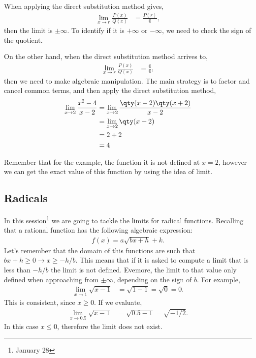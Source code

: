 \documentclass[../main-notes.tex]{subfile}
\begin{document}
When applying the direct substitution method gives,
\begin{align*}
    \lim_{x\to r}\frac{P(x)}{Q(x)} &= \frac{P(r)}{0},
\end{align*}
then the limit is \(\pm\infty\).
To identify if it is $+\infty$ or $-\infty$, we need to check the sign of the quotient.

On the other hand, when the direct substitution method arrives to,
\begin{align*}
    \lim_{x\to r}\frac{P(x)}{Q(x)} &= \frac{0}{0},
\end{align*}
then we need to make algebraic manipulation.
The main strategy is to factor and cancel common terms, and then apply the direct substitution method,
\begin{align*}
\lim_{x\to2}\frac{x^2-4}{x-2} &= \lim_{x\to2}\frac{\qty(x-2)\qty(x+2)}{x-2} \\
                              &= \lim_{x\to2}\qty(x+2) \\
                              &= 2+2 \\
                              &= 4
\end{align*}

Remember that for the example, the function it is not defined at $x=2$, however we can get the exact value of this function by using the idea of limit.

\newpage

\subsection{Radicals}

In this session\footnote{January 28} we are going to tackle the limits for radical functions.
Recalling that a rational function has the following algebraic expression:
\begin{gather*}
    f(x) = a\sqrt{bx+h}+k.
\end{gather*}
Let's remember that the domain of this functions are such that \(bx+h\geq0\to x\geq-h/b.\)
This means that if it is asked to compute a limit that is less than \(-h/b\) the limit is not defined.
Evemore, the limit to that value only defined when approaching from $\pm\infty$, depending on the sign of $b$.
For example,
\begin{align*}
    \lim_{x\to 1} \sqrt{x-1} &= \sqrt{1-1} = \sqrt{0} = 0.
\end{align*}
This is consistent, since $x\geq 0$.
If we evaluate,
\begin{align*}
    \lim_{x\to 0.5} \sqrt{x-1} &= \sqrt{0.5-1} = \sqrt{-1/2}.
\end{align*}
In this case $x\leq 0$, therefore the limit does not exist.
\end{document}
